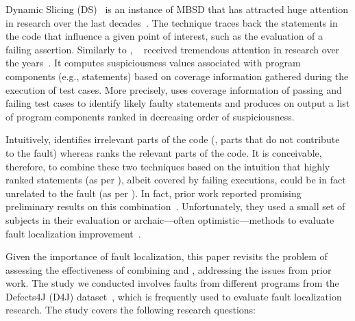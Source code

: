 \documentclass{article}
\begin{document}
Dynamic Slicing (DS)~\cite{Agrawal:1990:DPS:93542.93576} is an
instance of MBSD that has attracted huge attention in research over
the last decades~\cite{Silva:2012:VPS:2187671.2187674}. The technique
traces back the statements in the code that influence a given point of
interest, such as the evaluation of a failing assertion.  Similarly to
\ds{}, \sfl{}~\cite{DBLP:journals/stvr/HarroldRSWY00} received
tremendous attention in research over the years~\cite{7390282}.  It
computes suspiciousness values associated with program components
(e.g., statements) based on coverage information gathered during the
execution of test cases.  More precisely, \sfl{} uses coverage
information of passing and failing test cases to identify likely
faulty statements and produces on output a list of program components
ranked in decreasing order of suspiciousness.


Intuitively, \ds{} identifies irrelevant parts of the code (\ie{},
parts that do not contribute to the fault) whereas \sfl{} ranks the
relevant parts of the code. It is conceivable, therefore, to combine
these two techniques based on the intuition that highly ranked
statements (as per \sfl{}), albeit covered by failing executions,
could be in fact unrelated to the fault (as per \ds{}). In fact, prior
work reported promising preliminary results on this
combination~\cite{Wotawa:2010:FLB:1848650.1849235,Alves:2011:FUD:2190078.2190115,DBLP:conf/ecai/HoferW12,lei-mao-dai-wang-2012,slicing-sfl-repair}.
Unfortunately, they used a small set of subjects in their evaluation
or archaic---often optimistic---methods to evaluate fault localization
improvement~\cite{Wu:2014:CLC:2610384.2610386,Lucia:2014:FFL:2642937.2642983,Wen:2016:LLB:2970276.2970359}.

Given the importance of fault localization, this paper revisits the
problem of assessing the effectiveness of combining \ds{} and \sfl{},
addressing the issues from prior work. The study we conducted involves
\numFaults{} faults from \numPrograms{}
different programs from the Defects4J (D4J)
dataset~\cite{just-defects4j-issta2014}, which is frequently used to
evaluate fault localization research. The study covers the following
research questions:

\end{document}
